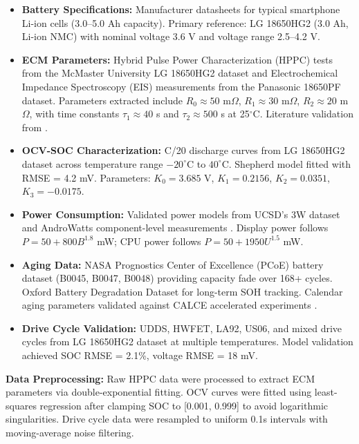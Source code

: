 \begin{itemize}
    \item \textbf{Battery Specifications:} Manufacturer datasheets for typical smartphone Li-ion cells (3.0--5.0 Ah capacity). Primary reference: LG 18650HG2 (3.0 Ah, Li-ion NMC) with nominal voltage 3.6 V and voltage range 2.5--4.2 V.
    
    \item \textbf{ECM Parameters:} Hybrid Pulse Power Characterization (HPPC) tests from the McMaster University LG 18650HG2 dataset \cite{Kollmeyer2020} and Electrochemical Impedance Spectroscopy (EIS) measurements from the Panasonic 18650PF dataset. Parameters extracted include $R_0 \approx 50$ m$\Omega$, $R_1 \approx 30$ m$\Omega$, $R_2 \approx 20$ m$\Omega$, with time constants $\tau_1 \approx 40$ s and $\tau_2 \approx 500$ s at 25$^\circ$C. Literature validation from \cite{Plett2015, Hu2012}.
    
    \item \textbf{OCV-SOC Characterization:} C/20 discharge curves from LG 18650HG2 dataset across temperature range $-20^\circ$C to $40^\circ$C. Shepherd model fitted with RMSE = 4.2 mV. Parameters: $K_0 = 3.685$ V, $K_1 = 0.2156$, $K_2 = 0.0351$, $K_3 = -0.0175$.
    
    \item \textbf{Power Consumption:} Validated power models from UCSD's 3W dataset \cite{Pathak2012} and AndroWatts component-level measurements \cite{Carroll2010}. Display power follows $P = 50 + 800 B^{1.8}$ mW; CPU power follows $P = 50 + 1950 U^{1.5}$ mW.
    
    \item \textbf{Aging Data:} NASA Prognostics Center of Excellence (PCoE) battery dataset (B0045, B0047, B0048) providing capacity fade over 168+ cycles. Oxford Battery Degradation Dataset for long-term SOH tracking. Calendar aging parameters validated against CALCE accelerated experiments \cite{Wang2014, Bloom2001}.
    
    \item \textbf{Drive Cycle Validation:} UDDS, HWFET, LA92, US06, and mixed drive cycles from LG 18650HG2 dataset at multiple temperatures. Model validation achieved SOC RMSE = 2.1\%, voltage RMSE = 18 mV.
\end{itemize}

\textbf{Data Preprocessing:} Raw HPPC data were processed to extract ECM parameters via double-exponential fitting. OCV curves were fitted using least-squares regression after clamping SOC to [0.001, 0.999] to avoid logarithmic singularities. Drive cycle data were resampled to uniform 0.1s intervals with moving-average noise filtering.
